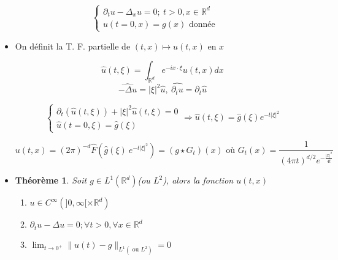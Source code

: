 \documentclass[10pt,a4paper,oneside]{article}
\newtheorem{theoreme}{Théorème}
\begin{document}
\[\begin{cases}
\partial_t u - \Delta_x u = 0;\ t > 0, x \in \mathbb{R}^d \\
u(t = 0,x) = g(x) \text{ donnée}
\end{cases}\]

\begin{itemize}
\item
On définit la T. F. partielle de $(t,x) \mapsto u(t,x)$ en $x$

\[ \hat{u}(t,\xi) = \int_{\mathbb{R}^d} e^{-ix \cdot \xi} u(t,x) dx \]
\[ \widehat{-\Delta u} = |\xi|^2 \hat{u},\ \widehat{\partial_t u} = \partial_t \hat{u} \]

\[\begin{cases}
\partial_t(\hat{u}(t,\xi)) + |\xi|^2 \hat{u}(t,\xi) = 0 \\
\hat{u}(t = 0,\xi) = \hat{g}(\xi)
\end{cases} \Rightarrow \hat{u}(t,\xi) = \hat{g}(\xi) e^{-t|\xi|^2} \]

\[ u(t,x) = (2\pi)^{-d} \hat{F}(\hat{g}(\xi)\ e^{-t|\xi|^2}) = (g \star G_t)(x) \text{ où } G_t(x) = \frac{1}{(4\pi t)^{d / 2}e^{-\frac{|x|^2}{4t}}} \]

\item
\begin{theoreme}
Soit $g \in L^1(\mathbb{R}^d)$(ou $L^2$), alors la fonction $u(t,x)$

\begin{enumerate}
\item
$u \in C^\infty(]0,\infty[ \times \mathbb{R}^d)$
\item
$\partial_t u - \Delta u = 0; \forall t > 0, \forall x \in \mathbb{R}^d$
\item
$\lim_{t \to 0^+} \| u(t) - g \|_{L^1 (\text{ ou } L^2)} = 0$
\end{enumerate}
\end{theoreme}
\end{itemize}
\end{document}
